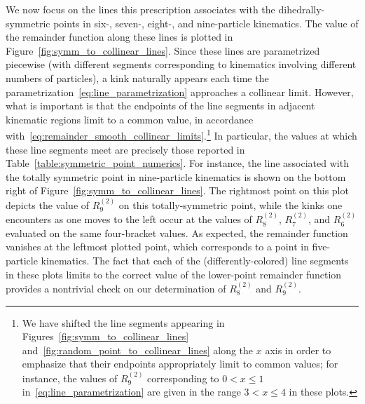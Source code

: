 \documentclass[11pt]{article}
\begin{document}
We now focus on the lines this prescription associates with the dihedrally-symmetric points in six-, seven-, eight-, and nine-particle kinematics. The value of the remainder function along these lines is plotted in Figure~\ref{fig:symm_to_collinear_lines}. Since these lines are parametrized piecewise (with different segments corresponding to kinematics involving different numbers of particles), a kink naturally appears each time the parametrization~\eqref{eq:line_parametrization} approaches a collinear limit. However, what is important is that the endpoints of the line segments in adjacent kinematic regions limit to a common value, in accordance with~\eqref{eq:remainder_smooth_collinear_limits}.\footnote{We have shifted the line segments appearing in Figures~\ref{fig:symm_to_collinear_lines} and~\ref{fig:random_point_to_collinear_lines} along the $x$ axis in order to emphasize that their endpoints appropriately limit to common values; for instance, the values of $R_9^{(2)}$\! corresponding to $0 < x \leq 1$ in~\eqref{eq:line_parametrization} are given in the range $3 < x \leq 4$ in these plots.} In particular, the values at which these line segments meet are precisely those reported in Table~\ref{table:symmetric_point_numerics}. For instance, the line associated with the totally symmetric point in nine-particle kinematics is shown on the bottom right of Figure~\ref{fig:symm_to_collinear_lines}. The rightmost point on this plot depicts the value of $R_9^{(2)}$\! on this totally-symmetric point, while the kinks one encounters as one moves to the left occur at the values of $R_8^{(2)}$\!, $R_7^{(2)}$\!, and $R_6^{(2)}$\! evaluated on the same four-bracket values. As expected, the remainder function vanishes at the leftmost plotted point, which corresponds to a point in five-particle kinematics. The fact that each of the (differently-colored) line segments in these plots limits to the correct value of the lower-point remainder function provides a nontrivial check on our determination of $R_8^{(2)}$\! and $R_9^{(2)}$\!.  
\end{document}
